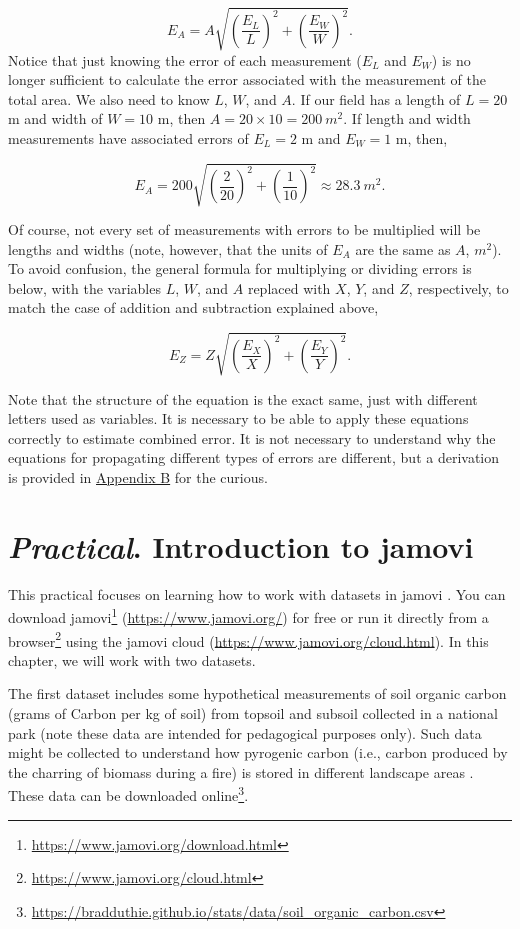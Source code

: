 \documentclass[
  openany]{krantz}
\renewcommand{\href}[2]{#2\footnote{\url{#1}}}
\begin{document}
\[E_{A} = A \sqrt{\left(\frac{E_{L}}{L} \right)^{2} + \left(\frac{E_{W}}{W} \right)^{2}}.\]
Notice that just knowing the error of each measurement (\(E_{L}\) and \(E_{W}\)) is no longer sufficient to calculate the error associated with the measurement of the total area.
We also need to know \(L\), \(W\), and \(A\).
If our field has a length of \(L = 20\) m and width of \(W = 10\) m, then \(A = 20 \times 10 = 200\:m^{2}\).
If length and width measurements have associated errors of \(E_{L} = 2\) m and \(E_{W} = 1\) m, then,

\[E_{A} = 200 \sqrt{\left(\frac{2}{20} \right)^{2} + \left(\frac{1}{10} \right)^{2}} \approx 28.3\:m^{2}.\]

Of course, not every set of measurements with errors to be multiplied will be lengths and widths (note, however, that the units of \(E_{A}\) are the same as \(A\), \(m^{2}\)).
To avoid confusion, the general formula for multiplying or dividing errors is below, with the variables \(L\), \(W\), and \(A\) replaced with \(X\), \(Y\), and \(Z\), respectively, to match the case of addition and subtraction explained above,

\[E_{Z} = Z \sqrt{\left(\frac{E_{X}}{X} \right)^{2} + \left(\frac{E_{Y}}{Y} \right)^{2}}.\]

Note that the structure of the equation is the exact same, just with different letters used as variables.
It is necessary to be able to apply these equations correctly to estimate combined error.
It is not necessary to understand why the equations for propagating different types of errors are different, but a derivation is provided in \protect\hyperlink{uncertainty_derivation}{Appendix B} for the curious.

\hypertarget{Chapter_8}{%
\chapter{\texorpdfstring{\emph{Practical}. Introduction to jamovi}{Practical. Introduction to jamovi}}\label{Chapter_8}}

This practical focuses on learning how to work with datasets in jamovi \citep{Jamovi2022}.
You can \href{https://www.jamovi.org/download.html}{download jamovi} (\url{https://www.jamovi.org/}) for free or run it directly \href{https://www.jamovi.org/cloud.html}{from a browser} using the jamovi cloud (\url{https://www.jamovi.org/cloud.html}).
In this chapter, we will work with two datasets.

The first dataset includes some hypothetical measurements of soil organic carbon (grams of Carbon per kg of soil) from topsoil and subsoil collected in a national park (note these data are intended for pedagogical purposes only).
Such data might be collected to understand how pyrogenic carbon (i.e., carbon produced by the charring of biomass during a fire) is stored in different landscape areas \citep{Santin2016, Preston2006}.
These data can be downloaded online\footnote{\url{https://bradduthie.github.io/stats/data/soil_organic_carbon.csv}}.
\end{document}
